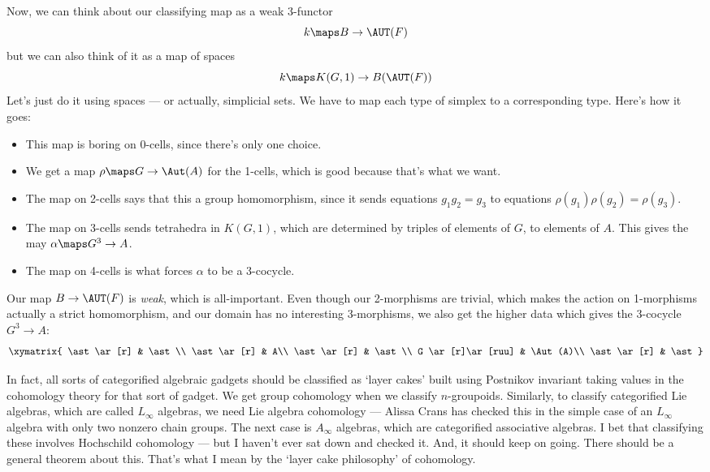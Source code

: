 \documentclass[12pt]{amsart}
\begin{document}
Now, we can think about our classifying map as a weak 3-functor
\[k\maps B \to \AUT(F)\]
but we can also think of it as a map of spaces
\[k\maps K(G,1) \to B(\AUT(F))\]
Let's just do it using spaces --- or actually, simplicial sets.  We have
to map each type of simplex to a corresponding type.  Here's how it
goes:
\begin{itemize}
\item This map is boring on 0-cells, since there's only one choice.
\item We get a map $\rho\maps G\to \Aut(A)$ for the 1-cells, which is good
  because that's what we want.
\item The map on 2-cells says that this a group homomorphism, since it
  sends equations $g_1g_2=g_3$ to equations
  $\rho(g_1)\rho(g_2)=\rho(g_3)$.
\item The map on 3-cells sends tetrahedra in $K(G,1)$, which are
  determined by triples of elements of $G$, to elements of $A$.  This
  gives the may $\alpha\maps G^3\to A$.
\item The map on 4-cells is what forces $\alpha$ to be a 3-cocycle.
\end{itemize}

Our map $B\to \AUT(F)$ is \emph{weak}, which is all-important.  Even
though our 2-morphisms are trivial, which makes the action on
1-morphisms actually a strict homomorphism, and our domain has no
interesting 3-morphisms, we also get the higher data which gives
the 3-cocycle $G^3\to A$:
\[\xymatrix{
  \ast \ar[r] & \ast\\
  \ast \ar[r] & A\\
  \ast \ar[r] & \ast\\
  G \ar[r]\ar[ruu] & \Aut(A)\\
  \ast \ar[r] & \ast  
}\]

In fact, all sorts of categorified algebraic
gadgets should be classified as `layer cakes' built using
Postnikov invariant taking values in the cohomology theory for that sort
of gadget.  We get group cohomology when we 
classify $n$-groupoids.   Similarly, to classify categorified Lie
algebras, which are called $L_\infty$ algebras, we need Lie algebra 
cohomology --- Alissa Crans has checked this in the simple case of an
$L_\infty$ algebra with only two nonzero chain groups.  The next case is 
$A_\infty$ algebras, which are categorified associative algebras.
I bet that classifying these involves Hochschild cohomology --- 
but I haven't ever sat down and checked it.  And, it should keep on
going.  There should be a general theorem about this.  That's
what I mean by the `layer cake philosophy' of cohomology.
\end{document}
